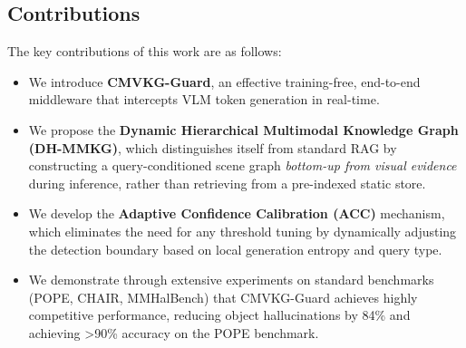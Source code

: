 \subsection{Contributions}
The key contributions of this work are as follows:
\begin{itemize}
    \item We introduce \textbf{CMVKG-Guard}, an effective training-free, end-to-end middleware that intercepts VLM token generation in real-time. 
    \item We propose the \textbf{Dynamic Hierarchical Multimodal Knowledge Graph (DH-MMKG)}, which distinguishes itself from standard RAG by constructing a query-conditioned scene graph \textit{bottom-up from visual evidence} during inference, rather than retrieving from a pre-indexed static store.
    \item We develop the \textbf{Adaptive Confidence Calibration (ACC)} mechanism, which eliminates the need for any threshold tuning by dynamically adjusting the detection boundary based on local generation entropy and query type.
    \item We demonstrate through extensive experiments on standard benchmarks (POPE, CHAIR, MMHalBench) that CMVKG-Guard achieves highly competitive performance, reducing object hallucinations by 84\% and achieving >90\% accuracy on the POPE benchmark. 
\end{itemize}

